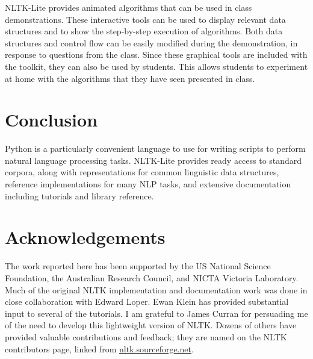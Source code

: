 \documentclass[11pt]{article}
\begin{document}
NLTK-Lite provides animated algorithms that can be used in class
demonstrations.  These interactive tools can be used to display
relevant data structures and to show the step-by-step execution of
algorithms. Both data structures and control flow can be easily
modified during the demonstration, in response to questions from the
class. Since these graphical tools are included with the toolkit, they
can also be used by students. This allows students to experiment at
home with the algorithms that they have seen presented in class.

\section{Conclusion}

Python is a particularly convenient language to use for writing
scripts to perform natural language processing tasks.  NLTK-Lite
provides ready access to standard corpora, along with representations
for common linguistic data structures, reference implementations for
many NLP tasks, and extensive documentation including tutorials and
library reference.

\section*{Acknowledgements}

The work reported here has been supported by the US National Science
Foundation, the Australian Research Council, and NICTA Victoria
Laboratory.  Much of the original NLTK implementation and
documentation work was done in close collaboration with Edward Loper.
Ewan Klein has provided substantial input to several of the tutorials.
I am grateful to James Curran for persuading me of the need to develop
this lightweight version of NLTK.  Dozens of others have provided
valuable contributions and feedback; they are named on the NLTK
contributors page, linked from \url{nltk.sourceforge.net}.



\end{document}
